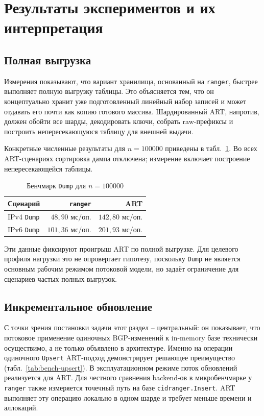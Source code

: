 \section{Результаты экспериментов и их интерпретация}
\label{sec:experiment-results}

\subsection{Полная выгрузка}

Измерения показывают, что вариант хранилища, основанный на
\texttt{ranger}, быстрее выполняет полную выгрузку таблицы. Это объясняется
тем, что он концептуально хранит уже подготовленный линейный набор
записей и может отдавать его почти как копию готового массива.
Шардированный ART, напротив, должен обойти все шарды, декодировать
ключи, собрать raw-префиксы и построить непересекающуюся таблицу для
внешней выдачи.

Конкретные численные результаты для $n=100000$ приведены в
табл.~\ref{tab:bench-dump}. Во всех ART-сценариях сортировка дампа
отключена; измерение включает построение непересекающейся таблицы.

\begin{table}[ht]
\centering
\caption{Бенчмарк \texttt{Dump} для $n=100000$}
\label{tab:bench-dump}
\footnotesize
\begin{tabular}{>{\raggedright\arraybackslash}p{4.2cm}rr}
\toprule
Сценарий & \texttt{ranger} & ART \\
\midrule
IPv4 \texttt{Dump} & $48{,}90$ мс/оп. & $142{,}80$ мс/оп. \\
IPv6 \texttt{Dump} & $101{,}36$ мс/оп. & $201{,}93$ мс/оп. \\
\bottomrule
\end{tabular}
\end{table}

Эти данные фиксируют проигрыш ART по полной выгрузке. Для целевого профиля
нагрузки это не опровергает гипотезу, поскольку \texttt{Dump} не является
основным рабочим режимом потоковой модели, но задаёт ограничение для
сценариев частых полных выгрузок.

\subsection{Инкрементальное обновление}

С точки зрения постановки задачи этот раздел -- центральный: он
показывает, что потоковое применение одиночных BGP-изменений к
in-memory базе технически осуществимо, а не только объявлено в
архитектуре. Именно на операции одиночного \texttt{Upsert} ART-подход
демонстрирует решающее преимущество (табл.~\ref{tab:bench-upsert}).
В эксплуатационном режиме поток обновлений реализуется для ART. Для
честного сравнения backend-ов в микробенчмарке у \texttt{ranger} также
измеряется точечный путь на базе \texttt{cidranger.Insert}. ART выполняет
эту операцию локально в одном шарде и требует меньше времени и аллокаций.

